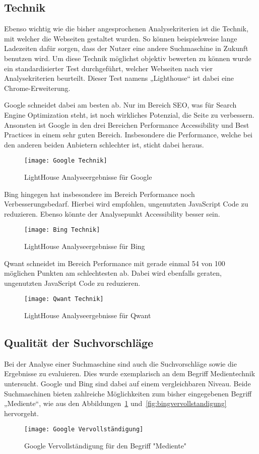\subsection{Technik}
Ebenso wichtig wie die bisher angesprochenen Analysekriterien ist die Technik, mit welcher die Webseiten gestaltet wurden.
So können beispielsweise lange Ladezeiten dafür sorgen, dass der Nutzer eine andere Suchmaschine in Zukunft benutzen wird.
Um diese Technik möglichst objektiv bewerten zu können wurde ein standardisierter Test durchgeführt, welcher Webseiten nach
vier Analysekriterien beurteilt. Dieser Test namens „Lighthouse“ ist dabei eine Chrome-Erweiterung.

Google schneidet dabei am besten ab. Nur im Bereich SEO, was für Search Engine Optimization steht, ist noch wirkliches
Potenzial, die Seite zu verbessern. Ansonsten ist Google in den drei Bereichen Performance Accessibility und Best Practices
in einem sehr guten Bereich. Insbesondere die Performance, welche bei den anderen beiden Anbietern schlechter ist,
sticht dabei heraus.
\begin{figure}[h]
    \centering
    \texttt{[image: Google Technik]}
    \caption{LightHouse Analyseergebnisse für Google}
\end{figure}

Bing hingegen hat insbesondere im Bereich Performance noch Verbesserungsbedarf. Hierbei wird empfohlen, ungenutzten JavaScript
Code zu reduzieren. Ebenso könnte der Analysepunkt Accessibility besser sein.
\begin{figure}[h]
    \centering
    \texttt{[image: Bing Technik]}
    \caption{LightHouse Analyseergebnisse für Bing}
\end{figure}

Qwant schneidet im Bereich Performance mit gerade einmal 54 von 100 möglichen Punkten am schlechtesten ab. Dabei wird ebenfalls
geraten, ungenutzten JavaScript Code zu reduzieren.
\begin{figure}[h]
    \centering
    \texttt{[image: Qwant Technik]}
    \caption{LightHouse Analyseergebnisse für Qwant}
\end{figure}

\subsection{Qualität der Suchvorschläge}
Bei der Analyse einer Suchmaschine sind auch die Suchvorschläge sowie die Ergebnisse zu evaluieren. Dies wurde exemplarisch
an dem Begriff Medientechnik untersucht. Google und Bing sind dabei auf einem vergleichbaren Niveau. Beide Suchmaschinen
bieten zahlreiche Möglichkeiten zum bisher eingegebenen Begriff „Mediente“, wie aus den Abbildungen~\ref{fig:googlevervollstandigung} und~\ref{fig:bingvervollstandigung} hervorgeht.
\begin{figure}[h]
    \centering
    \texttt{[image: Google Vervollständigung]}
    \caption{Google Vervollständigung für den Begriff "Mediente"}
    \label{fig:googlevervollstandigung}
\end{figure}

